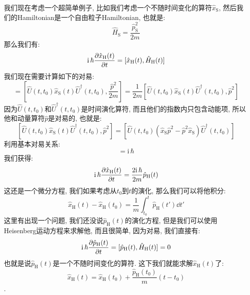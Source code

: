 我们现在考虑一个超简单例子, 比如我们考虑一个不随时间变化的算符$\hat{x}_{\text{S}}$, 然后我们的Hamiltonian是一个自由粒子Hamiltonian, 也就是:
\begin{equation}
  \hat{H}_{\text{S}} = \frac{\hat{p}^2_{\text{S}}}{2m}
\end{equation}
那么我们有:
\begin{equation}
  \mathrm{i}\, \hbar \pdv{\hat{x}_{\text{H}}(t)}{t} = [\hat{x}_{\text{H}}(t), \hat{H}_{\text{H}}(t)]
\end{equation}
我们现在需要计算如下的对易:
\begin{equation}
  [\hat{x}_{\text{H}}(t), \hat{H}_{\text{H}}(t)] = \left[\hat{U}(t,t_0) \hat{x}_{\text{S}}(t) \hat{U}^\dagger(t,t_0), \frac{\hat{p}^2}{2m}\right] = \frac{1}{2m} \left[\hat{U}(t,t_0) \hat{x}_{\text{S}}(t) \hat{U}^\dagger(t,t_0), \hat{p}^2\right]
\end{equation}
因为$\hat{U}(t,t_0)$和$\hat{U}^\dagger(t,t_0)$是时间演化算符, 而且他们的指数内只包含动能项, 所以他和动量算符$\hat{p}$是对易的, 也就是:
\begin{equation}
  \left[\hat{U}(t,t_0) \hat{x}_{\text{S}}(t) \hat{U}^\dagger(t,t_0), \hat{p}^2\right] = \left[ \hat{U}(t,t_0) (\hat{x}_{\text{S}} \hat{p}^2 - \hat{p}^2 \hat{x}_{\text{S}}) \hat{U}^\dagger(t,t_0) \right]
\end{equation}
利用基本对易关系:
\begin{equation}
  [\hat{x}, \hat{p}] = \mathrm{i}\, \hbar
\end{equation}
我们获得:
\begin{equation}
  \mathrm{i}\, \hbar \pdv{\hat{x}_{\text{H}}(t)}{t} = \frac{2 \mathrm{i}\, \hbar}{2m} \hat{p}_{\text{H}}(t)
\end{equation}
这还是一个微分方程, 我们如果考虑从$t_0$到$t$的演化, 那么我们可以将他积分:
\begin{equation}
  \hat{x}_{\text{H}}(t) - \hat{x}_{\text{H}}(t_0) = \frac{1}{m} \int_{t_0}^{t} \hat{p}_{\text{H}}(t') \dd{t'}
\end{equation}
这里有出现一个问题, 我们还没说$\hat{p}_{\text{H}}(t)$的演化方程, 但是我们可以使用Heisenberg运动方程来求解他, 而且很简单, 因为对易, 我们直接有:
\begin{equation}
  \mathrm{i}\, \hbar \pdv{\hat{p}_{\text{H}}(t)}{t} = [\hat{p}_{\text{H}}(t), \hat{H}_{\text{H}}(t)] = 0
\end{equation}
也就是说$\hat{p}_{\text{H}}(t)$是一个不随时间变化的算符.
这下我们就能求解$\hat{x}_{\text{H}}(t)$了:
\begin{equation}
  \hat{x}_{\text{H}}(t) = \hat{x}_{\text{H}}(t_0) + \frac{\hat{p}_{\text{H}}(t_0)}{m}  (t - t_0)
\end{equation}
.

